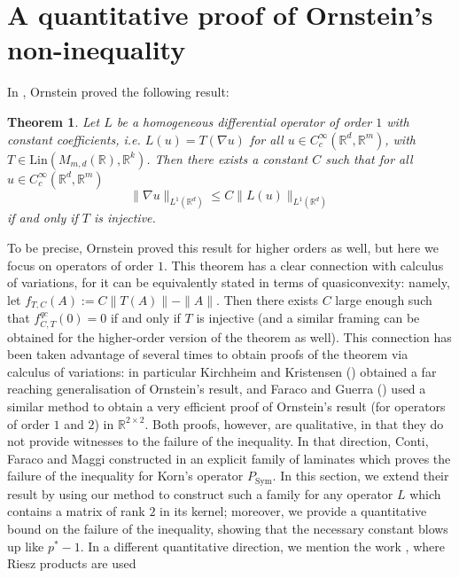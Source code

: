 \documentclass[11pt, a4paper, reqno]{elsarticle}
\newtheorem{theorem}{Theorem}[section]
\theoremstyle{definition}
\theoremstyle{remark}
\begin{document}
 \section{A quantitative proof of Ornstein's non-inequality}\label{sec : Ornstein}
 In \cite{Ornstein}, Ornstein proved the following result:
 \begin{theorem}
 Let $L$ be a homogeneous differential operator of order $1$ with 
 constant coefficients, i.e. $L(u)=T(\nabla u)$ for all $u\in C^\infty_c(\mathbb{R}^d, \mathbb{R}^m)$, with $T\in \mathrm{Lin}(M_{m,d}(\mathbb{R}), \mathbb{R}^k)$. Then there exists a constant $C$ such that
 for all $u\in C^{\infty}_c(\mathbb{R}^d, \mathbb{R}^m)$
 \begin{equation*}
     \|\nabla u\|_{L^{1}(\mathbb{R}^d)}\le C \|L(u)\|_{L^1(\mathbb{R}^d)}
 \end{equation*}
 if and only if $T$ is injective.
 \end{theorem}
 To be precise, Ornstein proved this result for higher orders as well, but here we focus
 on operators of order $1$. This theorem has a clear connection
 with calculus of variations, for it can be equivalently stated in terms
 of quasiconvexity: namely, let $f_{T,C}(A):=C\|T(A)\|-\|A\|$. Then there exists $C$ large enough such that $f^{qc}_{C,T}(0)=0$ if and only if $T$
 is injective (and a similar framing can be obtained for the higher-order version of the theorem as well). This connection has been taken advantage of
 several times to obtain proofs of the theorem via calculus of variations:
 in particular Kirchheim and Kristensen (\cite[Theorem 1.3]{KirchheimJan})
 obtained a far reaching generalisation of Ornstein's result, and Faraco
 and Guerra (\cite{Faraco2022}) used a similar method to obtain
 a very efficient proof of Ornstein's result (for operators of order $1$ and $2$)
 in $\mathbb{R}^{2\times 2}.$ Both proofs, however, are qualitative,
 in that they do not provide witnesses to the failure of the inequality.
 In that direction, Conti, Faraco and Maggi constructed
 in \cite{Conti2005AFunctions}
 an explicit family of laminates which proves the failure of the inequality
 for Korn's operator $P_{\mathrm{Sym}}$. In this section, we extend their
 result by using our method to construct such a family for any operator
 $L$ which contains a matrix of rank $2$ in its kernel; moreover, we provide a quantitative bound on the failure of the inequality, showing that the
 necessary constant blows up like $p^*-1$. In a different quantitative
 direction, we mention the work \cite{Kazaniecki2023}, where Riesz products are used
\end{document}
